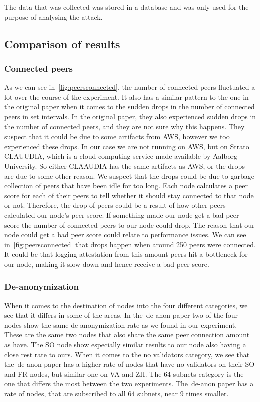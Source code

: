 The data that was collected was stored in a database and was only used for the purpose of analysing the attack.

\subsection{Comparison of results}\label{subsec:res-comparison}

\subsubsection{Connected peers}\label{subsubsec:connected-peers}
As we can see in~\autoref{fig:peersconnected}, the number of connected peers fluctuated a lot over the course of the experiment.
It also has a similar pattern to the one in the original paper when it comes to the sudden drops in the number of connected peers in set intervals.
In the original paper, they also experienced sudden drops in the number of connected peers, and they are not sure why this happens.
They suspect that it could be due to some artifacts from AWS, however we too experienced these drops.
In our case we are not running on AWS, but on Strato CLAUUDIA, which is a cloud computing service made available by Aalborg University.
So either CLAAUDIA has the same artifacts as AWS, or the drops are due to some other reason.
We suspect that the drops could be due to garbage collection of peers that have been idle for too long.
Each node calculates a peer score for each of their peers to tell whether it should stay connected to that node or not.
Therefore, the drop of peers could be a result of how other peers calculated our node's peer score.
If something made our node get a bad peer score the number of connected peers to our node could drop.
The reason that our node could get a bad peer score could relate to performance issues.
We can see in~\autoref{fig:peersconnected} that drops happen when around 250 peers were connected.
It could be that logging attestation from this amount peers hit a bottleneck for our node, making it slow down and hence receive a bad peer score.

\subsubsection{De-anonymization}\label{subsubsec:de-anonymization}
When it comes to the destination of nodes into the four different categories, we see that it differs in some of the areas.
In the~\gls{de-anon paper} two of the four nodes show the same de-anonymization rate as we found in our experiment.
These are the same two nodes that also share the same peer connection amount as have.
The SO node show especially similar results to our node also having a close rest rate to ours.
When it comes to the no validators category, we see that the~\gls{de-anon paper} has a higher rate of nodes that have no validators on their SO and FR nodes, but similar one on VA and ZH.
The 64 subnets category is the one that differs the most between the two experiments.
The~\gls{de-anon paper} has a rate of nodes, that are subscribed to all 64 subnets, near 9 times smaller.



